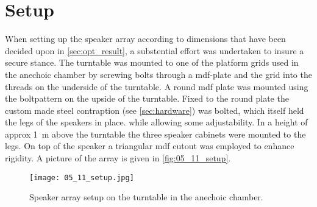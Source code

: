 \section*{Setup}\label{sec:05_11_setup}
When setting up the speaker array according to dimensions that have been decided upon in \autoref{sec:opt_result}, a substential effort was undertaken to insure a secure stance. The turntable was mounted to one of the platform grids used in the anechoic chamber by screwing bolts through a \gls{mdf}-plate and the grid into the threads on the underside of the turntable. A round \gls{mdf} plate was mounted using the boltpattern on the upside of the turntable. Fixed to the round plate the custom made steel contraption (see \autoref{sec:hardware}) was bolted, which itself held the legs of the speakers in place. while allowing some adjustability. In a height of approx \SI{1}{\meter} above the turntable the three speaker cabinets were mounted to the legs. On top of the speaker a triangular \gls{mdf} cutout was employed to enhance rigidity. A picture of the array is given in \autoref{fig:05_11_setup}.

\begin{figure}[h]
	\centering
    \texttt{[image: 05\_11\_setup.jpg]}
    \caption{Speaker array setup on the turntable in the anechoic chamber.}
    \label{fig:05_11_setup}
\end{figure}

